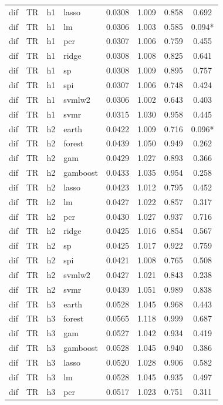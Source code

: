 \begin{ThreePartTable}
\begin{longtable}[t]{llclcccc}
dif & TR & h1 & lasso & 0.0308 & 1.009 & 0.858 & 0.692\\
dif & TR & h1 & lm & 0.0306 & 1.003 & 0.585 & 0.094*\\
dif & TR & h1 & pcr & 0.0307 & 1.006 & 0.759 & 0.455\\
dif & TR & h1 & ridge & 0.0308 & 1.008 & 0.825 & 0.641\\
dif & TR & h1 & sp & 0.0308 & 1.009 & 0.895 & 0.757\\
dif & TR & h1 & spi & 0.0307 & 1.006 & 0.748 & 0.424\\
dif & TR & h1 & svmlw2 & 0.0306 & 1.002 & 0.643 & 0.403\\
dif & TR & h1 & svmr & 0.0315 & 1.030 & 0.958 & 0.445\\
\addlinespace
dif & TR & h2 & earth & 0.0422 & 1.009 & 0.716 & 0.096*\\
dif & TR & h2 & forest & 0.0439 & 1.050 & 0.949 & 0.262\\
dif & TR & h2 & gam & 0.0429 & 1.027 & 0.893 & 0.366\\
dif & TR & h2 & gamboost & 0.0433 & 1.035 & 0.954 & 0.258\\
dif & TR & h2 & lasso & 0.0423 & 1.012 & 0.795 & 0.452\\
dif & TR & h2 & lm & 0.0427 & 1.022 & 0.857 & 0.317\\
dif & TR & h2 & pcr & 0.0430 & 1.027 & 0.937 & 0.716\\
dif & TR & h2 & ridge & 0.0425 & 1.016 & 0.854 & 0.567\\
dif & TR & h2 & sp & 0.0425 & 1.017 & 0.922 & 0.759\\
dif & TR & h2 & spi & 0.0421 & 1.008 & 0.765 & 0.508\\
dif & TR & h2 & svmlw2 & 0.0427 & 1.021 & 0.843 & 0.238\\
dif & TR & h2 & svmr & 0.0439 & 1.051 & 0.989 & 0.838\\
\addlinespace
dif & TR & h3 & earth & 0.0528 & 1.045 & 0.968 & 0.443\\
dif & TR & h3 & forest & 0.0565 & 1.118 & 0.999 & 0.687\\
dif & TR & h3 & gam & 0.0527 & 1.042 & 0.934 & 0.419\\
dif & TR & h3 & gamboost & 0.0528 & 1.045 & 0.940 & 0.386\\
dif & TR & h3 & lasso & 0.0520 & 1.028 & 0.906 & 0.582\\
dif & TR & h3 & lm & 0.0528 & 1.045 & 0.935 & 0.497\\
dif & TR & h3 & pcr & 0.0517 & 1.023 & 0.751 & 0.311\\

\end{longtable}
\end{ThreePartTable}
